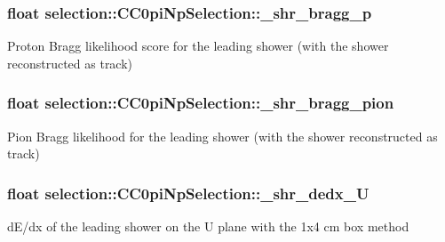 \subsubsection[{\texorpdfstring{\+\_\+shr\+\_\+bragg\+\_\+p}{_shr_bragg_p}}]{\setlength{\rightskip}{0pt plus 5cm}float selection\+::\+C\+C0pi\+Np\+Selection\+::\+\_\+shr\+\_\+bragg\+\_\+p\hspace{0.3cm}{\ttfamily [private]}}\hypertarget{classselection_1_1CC0piNpSelection_acb447ca93f046abd1540291ba0d41e73}{}\label{classselection_1_1CC0piNpSelection_acb447ca93f046abd1540291ba0d41e73}
Proton Bragg likelihood score for the leading shower (with the shower reconstructed as track) 
\subsubsection[{\texorpdfstring{\+\_\+shr\+\_\+bragg\+\_\+pion}{_shr_bragg_pion}}]{\setlength{\rightskip}{0pt plus 5cm}float selection\+::\+C\+C0pi\+Np\+Selection\+::\+\_\+shr\+\_\+bragg\+\_\+pion\hspace{0.3cm}{\ttfamily [private]}}\hypertarget{classselection_1_1CC0piNpSelection_afa97d9a456bf2255e06c6c5226f25929}{}\label{classselection_1_1CC0piNpSelection_afa97d9a456bf2255e06c6c5226f25929}
Pion Bragg likelihood for the leading shower (with the shower reconstructed as track) 
\subsubsection[{\texorpdfstring{\+\_\+shr\+\_\+dedx\+\_\+U}{_shr_dedx_U}}]{\setlength{\rightskip}{0pt plus 5cm}float selection\+::\+C\+C0pi\+Np\+Selection\+::\+\_\+shr\+\_\+dedx\+\_\+U\hspace{0.3cm}{\ttfamily [private]}}\hypertarget{classselection_1_1CC0piNpSelection_ada2f72c2f814e7d06c24a50ff5ad4fcc}{}\label{classselection_1_1CC0piNpSelection_ada2f72c2f814e7d06c24a50ff5ad4fcc}
d\+E/dx of the leading shower on the U plane with the 1x4 cm box method 
